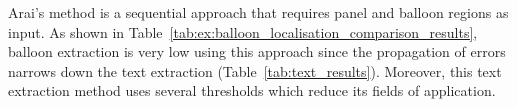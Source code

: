 
Arai's method is a sequential approach that requires panel and balloon regions as input.
As shown in Table~\ref{tab:ex:balloon_localisation_comparison_results}, balloon extraction is very low using this approach since the propagation of errors narrows down the text extraction (Table~\ref{tab:text_results}).
Moreover, this text extraction method uses several thresholds which reduce its fields of application.


